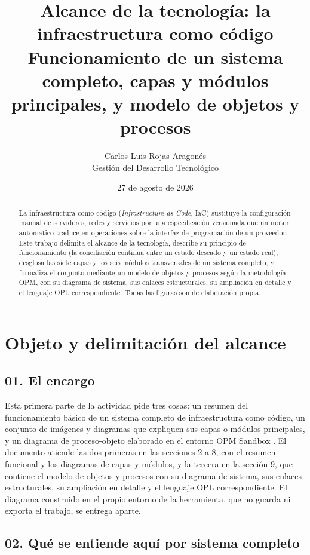 \documentclass[11pt,letterpaper]{article}
\title{\textbf{Alcance de la tecnología: la infraestructura como código}\\
\large Funcionamiento de un sistema completo, capas y módulos principales,
y modelo de objetos y procesos}
\author{Carlos Luis Rojas Aragonés\\
Gestión del Desarrollo Tecnológico}
\date{27 de agosto de 2026}
\begin{document}
\maketitle

\begin{abstract}
\noindent\small
La infraestructura como código (\emph{Infrastructure as Code}, IaC) sustituye
la configuración manual de servidores, redes y servicios por una
especificación versionada que un motor automático traduce en operaciones sobre
la interfaz de programación de un proveedor. Este trabajo delimita el alcance
de la tecnología, describe su principio de funcionamiento (la conciliación
continua entre un estado deseado y un estado real), desglosa las siete capas y
los seis módulos transversales de un sistema completo, y formaliza el conjunto
mediante un modelo de objetos y procesos según la metodología OPM, con su
diagrama de sistema, sus enlaces estructurales, su ampliación en detalle y el
lenguaje OPL correspondiente. Todas las figuras son de elaboración propia.
\end{abstract}

\section{Objeto y delimitación del alcance}

\subsection*{01. El encargo}

Esta primera parte de la actividad pide tres cosas: un resumen del
funcionamiento básico de un sistema completo de infraestructura como código,
un conjunto de imágenes y diagramas que expliquen sus capas o módulos
principales, y un diagrama de proceso-objeto elaborado en el entorno OPM
Sandbox \parencite{opcloud}. El documento atiende las dos primeras en las
secciones 2 a 8, con el resumen funcional y los diagramas de capas y módulos,
y la tercera en la sección 9, que contiene el modelo de objetos y procesos con
su diagrama de sistema, sus enlaces estructurales, su ampliación en detalle y
el lenguaje OPL correspondiente. El diagrama construido en el propio entorno
de la herramienta, que no guarda ni exporta el trabajo, se entrega aparte.

\subsection*{02. Qué se entiende aquí por sistema completo}
\end{document}
